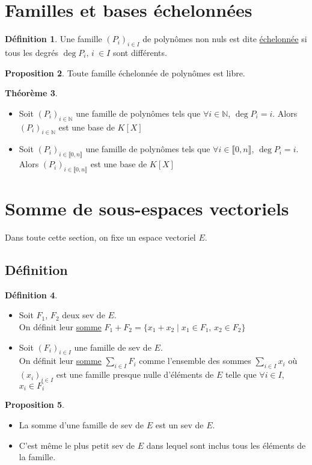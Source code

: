\documentclass[10pt,a4paper]{article}
\theoremstyle{definition}
\newtheorem{proposition}{Proposition}[section]
\newtheorem{theorem}[proposition]{Théorème}
\newtheorem{definition}[proposition]{Définition}
\begin{document}
\section{Familles et bases échelonnées}
\begin{definition}
Une famille $(P_i)_{i \in I}$ de polynômes non nuls est dite \uline{échelonnée} si tous les degrés $\deg P_i,\, i\ \in I$ sont différents.
\end{definition}
\begin{proposition}
Toute famille échelonnée de polynômes est libre.
\end{proposition}
\begin{theorem}
\hfill
\begin{itemize}
\item Soit $(P_i)_{i \in \mathbb{N}}$ une famille de polynômes tels que $\forall i \in \mathbb{N}$, $\deg P_i = i$. Alors $(P_i)_{i \in \mathbb{N}}$ est une base de $K[X]$
\item Soit $(P_i)_{i \in \llbracket 0, n \rrbracket}$ une famille de polynômes tels que $\forall i \in \llbracket 0, n \rrbracket$, $\deg P_i = i$. Alors $(P_i)_{i \in \llbracket 0, n \rrbracket}$ est une base de $K[X]$
\end{itemize}
\end{theorem}

\pagebreak

\section{Somme de sous-espaces vectoriels}
Dans toute cette section, on fixe un espace vectoriel $E$.
\subsection{Définition}
\begin{definition}
\hfill
\begin{itemize}
\item Soit $F_1$, $F_2$ deux sev de $E$. \\
On définit leur \uline{somme} $F_1 + F_2 = \{ x_1 + x_2 \mid x_1 \in F_1,\, x_2 \in F_2 \}$
\item Soit $(F_i)_{i \in I}$ une famille de sev de $E$. \\
On définit leur \uline{somme} $\sum\limits_{i \in I} F_i$ comme l'ensemble des sommes $\sum\limits_{i \in I} x_i$ où $(x_i)_{i \in I}$ est une famille presque nulle d'éléments de $E$ telle que $\forall i \in I$, $x_i \in F_i$
\end{itemize}
\end{definition}
\begin{proposition}
\hfill
\begin{itemize}
\item La somme d'une famille de sev de $E$ est un sev de $E$.
\item C'est même le plus petit sev de $E$ dans lequel sont inclus tous les éléments de la famille.
\end{itemize}
\end{proposition}
\end{document}

